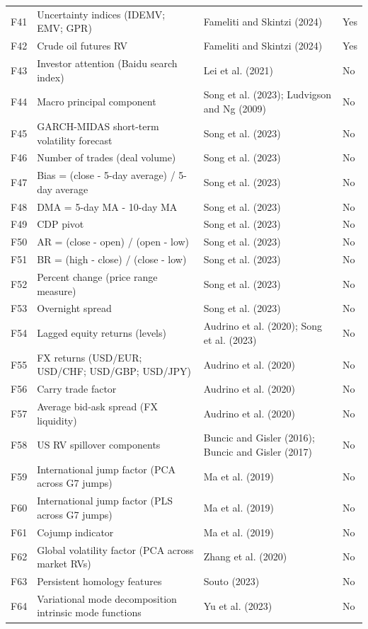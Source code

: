 {\begin{longtable}{>{\raggedright\arraybackslash}m{0.7cm}>{\raggedright\arraybackslash}m{5.5cm}>{\raggedright\arraybackslash}m{5.1cm}>{\raggedleft\arraybackslash}m{1.5cm}}
F41 & Uncertainty indices (IDEMV; EMV; GPR) & Fameliti and Skintzi (2024) & Yes \\
F42 & Crude oil futures RV & Fameliti and Skintzi (2024) & Yes \\
F43 & Investor attention (Baidu search index) & Lei et al. (2021) & No \\
F44 & Macro principal component & Song et al. (2023); Ludvigson and Ng (2009) & No \\
F45 & GARCH-MIDAS short-term volatility forecast & Song et al. (2023) & No \\
F46 & Number of trades (deal volume) & Song et al. (2023) & No \\
F47 & Bias = (close - 5-day average) / 5-day average & Song et al. (2023) & No \\
F48 & DMA = 5-day MA - 10-day MA & Song et al. (2023) & No \\
F49 & CDP pivot & Song et al. (2023) & No \\
F50 & AR = (close - open) / (open - low) & Song et al. (2023) & No \\
F51 & BR = (high - close) / (close - low) & Song et al. (2023) & No \\
F52 & Percent change (price range measure) & Song et al. (2023) & No \\
F53 & Overnight spread & Song et al. (2023) & No \\
F54 & Lagged equity returns (levels) & Audrino et al. (2020); Song et al. (2023) & No \\
F55 & FX returns (USD/EUR; USD/CHF; USD/GBP; USD/JPY) & Audrino et al. (2020) & No \\
F56 & Carry trade factor & Audrino et al. (2020) & No \\
F57 & Average bid-ask spread (FX liquidity) & Audrino et al. (2020) & No \\
F58 & US RV spillover components & Buncic and Gisler (2016); Buncic and Gisler (2017) & No \\
F59 & International jump factor (PCA across G7 jumps) & Ma et al. (2019) & No \\
F60 & International jump factor (PLS across G7 jumps) & Ma et al. (2019) & No \\
F61 & Cojump indicator & Ma et al. (2019) & No \\
F62 & Global volatility factor (PCA across market RVs) & Zhang et al. (2020) & No \\
F63 & Persistent homology features & Souto (2023) & No \\
F64 & Variational mode decomposition intrinsic mode functions & Yu et al. (2023) & No \\

\end{longtable}}
